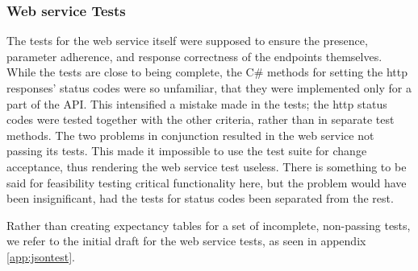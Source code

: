 \subsubsection{Web service Tests}
The tests for the web service itself were supposed to ensure the presence,
parameter adherence, and response correctness of the endpoints themselves.
While the tests are close to being complete, the C\# methods for setting the
http responses' status codes were so unfamiliar, that they were implemented only
for a part of the API. This intensified a mistake made in the tests; the http
status codes were tested together with the other criteria, rather than in
separate test methods. The two problems in conjunction resulted in the web
service not passing its tests. This made it impossible to use the test suite for
change acceptance, thus rendering the web service test useless. There is
something to be said for feasibility testing critical functionality here, but
the problem would have been insignificant, had the tests for status codes been
separated from the rest.

Rather than creating expectancy tables for a set of incomplete, non-passing
tests, we refer to the initial draft for the web service tests, as seen in
appendix \ref{app:jsontest}.
